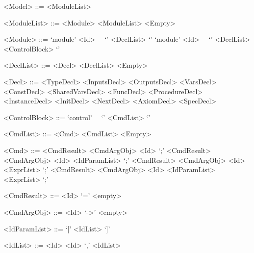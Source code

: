 \begin{grammar}
     <Model> ::= <ModuleList>

     <ModuleList> ::= <Module> <ModuleList> \alt <Empty>

     <Module> ::= `module' <Id>~~ `{' <DeclList> `}'
              \alt `module' <Id>~~ `{' <DeclList> <ControlBlock> `}'

     <DeclList> ::= <Decl> <DeclList> \alt <Empty>

     <Decl> ::= <TypeDecl> 
            \alt <InputsDecl> 
            \alt <OutputsDecl> 
            \alt <VarsDecl> 
            \alt <ConstDecl> 
            \alt <SharedVarsDecl> 
            \alt <FuncDecl> 
            \alt <ProcedureDecl> 
            \alt <InstanceDecl>
            \alt <InitDecl> 
            \alt <NextDecl> 
            \alt <AxiomDecl>
            \alt <SpecDecl> 

     <ControlBlock> ::= `control'~~ `{' <CmdList> `}'

     <CmdList> ::= <Cmd> <CmdList> \alt <Empty>

     <Cmd> ::=
       <CmdResult> <CmdArgObj>  <Id> `;'
       \alt <CmdResult> <CmdArgObj>  <Id> <IdParamList> `;'
       \alt <CmdResult> <CmdArgObj>  <Id> <ExprList> `;'
       \alt <CmdResult> <CmdArgObj>  <Id> <IdParamList> <ExprList> `;' 

     <CmdResult> ::=  <Id> `=' \alt <empty>
 
     <CmdArgObj> ::= <Id> `->' \alt <empty>

     <IdParamList> ::= `[' <IdList> `]'

     <IdList> ::= <Id> \alt <Id> `,' <IdList>
\end{grammar}

